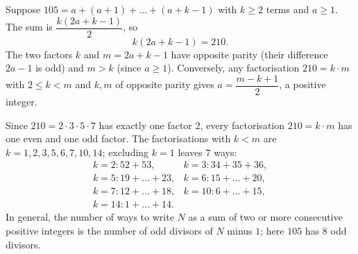 Suppose $105=a+(a+1)+\dots+(a+k-1)$ with $k\ge2$ terms and $a\ge1$. The sum is $\dfrac{k(2a+k-1)}{2}$, so
\[
k(2a+k-1)=210 .
\]
The two factors $k$ and $m=2a+k-1$ have opposite parity (their difference $2a-1$ is odd) and $m>k$ (since $a\ge1$). Conversely, any factorisation $210=k\cdot m$ with $2\le k<m$ and $k,m$ of opposite parity gives $a=\dfrac{m-k+1}{2}$, a positive integer.

Since $210=2\cdot3\cdot5\cdot7$ has exactly one factor $2$, every factorisation $210=k\cdot m$ has one even and one odd factor. The factorisations with $k<m$ are $k=1,2,3,5,6,7,10,14$; excluding $k=1$ leaves $\boxed{7}$ ways:
\[
\begin{array}{ll}
k=2: 52+53, & k=3: 34+35+36,\\
k=5: 19+\dots+23, & k=6: 15+\dots+20,\\
k=7: 12+\dots+18, & k=10: 6+\dots+15,\\
k=14: 1+\dots+14 . &
\end{array}
\]
In general, the number of ways to write $N$ as a sum of two or more consecutive positive integers is the number of odd divisors of $N$ minus $1$; here $105$ has $8$ odd divisors.
